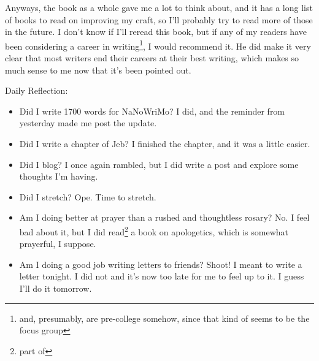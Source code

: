 \documentclass[12pt]{article}[titlepage]
\newcommand{\1}{\={a}}
\newcommand{\2}{\={e}}
\newcommand{\3}{\={\i}}
\newcommand{\4}{\=o}
\newcommand{\5}{\=u}
\newcommand{\6}{\={A}}
\renewcommand{\,}{\textsuperscript{,}}
\begin{document}
Anyways, the book as a whole gave me a lot to think about, and it has a long list of books to read on improving my craft, so I'll probably try to read more of those in the future.
I don't know if I'll reread this book, but if any of my readers have been considering a career in writing\footnote{and, presumably, are pre-college somehow, since that kind of seems to be the focus group}, I would recommend it.
He did make it very clear that most writers end their careers at their best writing, which makes so much sense to me now that it's been pointed out.

Daily Reflection:
\begin{itemize}
\item Did I write 1700 words for NaNoWriMo?
I did, and the reminder from yesterday made me post the update.
\item Did I write a chapter of Jeb?
I finished the chapter, and it was a little easier.
\item Did I blog? I once again rambled, but I did write a post and explore some thoughts I'm having.
\item Did I stretch? Ope. Time to stretch.
\item Am I doing better at prayer than a rushed and thoughtless rosary? 
No.
I feel bad about it, but I did read\footnote{part of} a book on apologetics, which is somewhat prayerful, I suppose.
\item Am I doing a good job writing letters to friends?
Shoot! I meant to write a letter tonight. I did not and it's now too late for me to feel up to it.
I guess I'll do it tomorrow.
\end{itemize}
\end{document}
